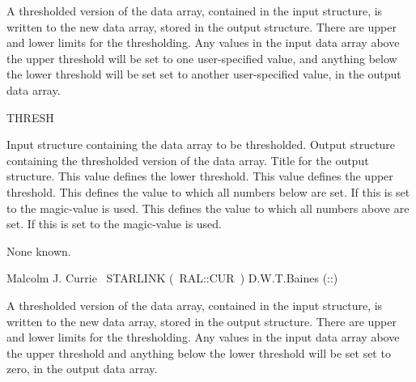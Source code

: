 {\begin{manroutinedescription}
\end{manroutinedescription}

\begin{manroutinedescription}
  A thresholded version of the data array, contained in the input
  {} structure, is written to the new data array, stored in
  the output {} structure. There are upper and lower limits
  for the thresholding. Any values in the input data array above
  the upper threshold will be set to one user-specified value, and
  anything below the lower threshold will be set set to another
  user-specified value, in the output data array.

  THRESH

\begin{manparametertable}
  Input {} structure containing the data array to be
  thresholded.
  Output {} structure containing the thresholded version of
  the data array.
  Title for the output {} structure.
 \mbox{{}}
  This value defines the lower threshold.
  This value defines the upper threshold.
  This defines the value to which all numbers below {} are
  set.  If this is set to {} the magic-value is used.
  This defines the value to which all numbers above {} are
  set.  If this is set to {} the magic-value is used.
\end{manparametertable}
  None known.

  Malcolm J. Currie ~STARLINK \mbox{( {\mantt RAL}::{\mantt CUR} )}
  D.W.T.Baines ({}::{})
\end{manroutinedescription}

\begin{manroutinedescription}
  A thresholded version of the data array, contained in the input
  {} structure, is written to the new data array, stored in
  the output {} structure. There are upper and lower limits
  for the thresholding. Any values in the input data array above
  the upper threshold and anything below the lower threshold will
  be set set to zero, in the output data array.


\end{manroutinedescription}}
